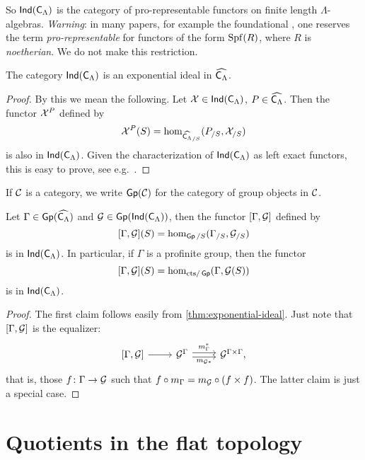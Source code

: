 \documentclass[phd,cornellheadings,draft]{cornell}
\begin{document}
So $\operatorname{\mathsf{Ind}}(\mathsf{C}_\Lambda)$ is the category of pro-representable 
functors on finite length $\Lambda$-algebras. \emph{Warning}: in many papers, 
for example the foundational \cite{mazur-1995}, one reserves the term 
\emph{pro-representable} for functors of the form $\operatorname{Spf}(R)$, where $R$ is 
\emph{noetherian}. We do not make this restriction. 

\begin{lemma}\label{thm:exponential-ideal}
The category $\operatorname{\mathsf{Ind}}(\mathsf{C}_\Lambda)$ is an exponential ideal in 
$\widehat{\mathsf{C}_\Lambda}$. 
\end{lemma}
\begin{proof}
By this we mean the following. Let $\mathcal{X}\in \operatorname{\mathsf{Ind}}(\mathsf{C}_\Lambda)$, 
$P\in \widehat{\mathsf{C}_\Lambda}$. Then the functor $\mathcal{X}^P$ defined by 
\[
	\mathcal{X}^P(S) = \hom_{\widehat{\mathsf{C}_\Lambda}_{/S}}(P_{/S},\mathcal{X}_{/S}) 
\]
is also in $\operatorname{\mathsf{Ind}}(\mathsf{C}_\Lambda)$. Given the characterization of 
$\operatorname{\mathsf{Ind}}(\mathsf{C}_\Lambda)$ as left exact functors, this is easy to 
prove, see e.g.~\cite[4.2.3]{johnstone-2002}. 
\end{proof}

If $\mathcal{C}$ is a category, we write $\operatorname{\mathsf{Gp}}(\mathcal{C})$ for the category of group 
objects in $\mathcal{C}$. 

\begin{corollary}\label{thm:framed-deformation}
Let $\Gamma\in \operatorname{\mathsf{Gp}}(\widehat{\mathsf{C}_\Lambda})$ and 
$\mathcal{G}\in \operatorname{\mathsf{Gp}}(\operatorname{\mathsf{Ind}}(\mathsf{C}_\Lambda))$, then the functor 
$[\Gamma,\mathcal{G}]$ defined by 
\[
	[\Gamma,\mathcal{G}](S) = \hom_{\operatorname{\mathsf{Gp}}/S}(\Gamma_{/S},\mathcal{G}_{/S}) 
\]
is in $\operatorname{\mathsf{Ind}}(\mathsf{C}_\Lambda)$. In particular, if $\Gamma$ is a 
profinite group, then the functor 
\[
	[\Gamma,\mathcal{G}](S) = \hom_{\mathrm{cts}/\operatorname{\mathsf{Gp}}}(\Gamma,\mathcal{G}(S))
\]
is in $\operatorname{\mathsf{Ind}}(\mathsf{C}_\Lambda)$. 
\end{corollary}
\begin{proof}
The first claim follows easily from \ref{thm:exponential-ideal}. Just note 
that $[\Gamma,\mathcal{G}]$ is the equalizer:
\[
\begin{tikzcd}
	{[\Gamma,\cG]} \ar[r]
		& \cG^\Gamma \ar[r, "m_\Gamma^\ast", shift left=.5ex] \ar[r, "m_{\cG\ast}"', shift right=.5ex]
		& \cG^{\Gamma\times \Gamma} ,
\end{tikzcd}
\]
that is, those $f\colon \Gamma\to \mathcal{G}$ such that 
$f\circ m_\Gamma = m_{\mathcal{G}}\circ(f\times f)$. The latter claim is just 
a special case. 
\end{proof}





\section{Quotients in the flat topology}
\end{document}

